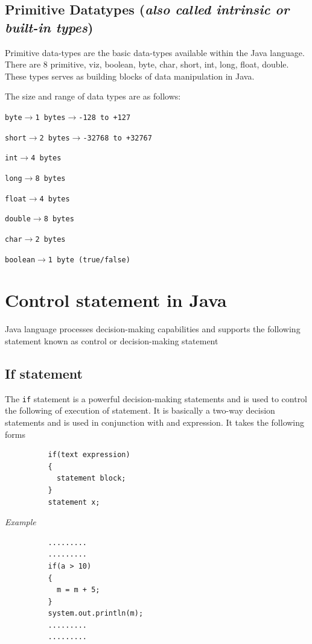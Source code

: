 \documentclass[11pt, a4paper]{book}
\begin{document}
    \subsection{Primitive Datatypes (\textit{also called intrinsic or built-in types})}
      Primitive data-types are the basic data-types available within the Java language. There are 8 primitive, viz, boolean, byte, char, short, int, long, float, double. These types serves as building blocks of data manipulation in Java.
  
      The size and range of data types are as follows:
  
      \texttt{byte}$\rightarrow$\texttt{1 bytes}$\rightarrow$\texttt{-128 to +127}
  
      \texttt{short}$\rightarrow$\texttt{2 bytes}$\rightarrow$\texttt{-32768 to +32767}
  
      \texttt{int}$\rightarrow$\texttt{4 bytes}
  
      \texttt{long}$\rightarrow$\texttt{8 bytes}
  
      \texttt{float}$\rightarrow$\texttt{4 bytes}
  
      \texttt{double}$\rightarrow$\texttt{8 bytes}
  
      \texttt{char}$\rightarrow$\texttt{2 bytes}
  
      \texttt{boolean}$\rightarrow$\texttt{1 byte (true/false)}
  
    \section{Control statement in Java}
      Java language processes decision-making capabilities and supports the following statement known as control or decision-making statement
      \subsection{If statement}
  
        The \texttt{if} statement is a powerful decision-making statements and is used to control the following of execution of statement. It is basically a two-way decision statements and is used in conjunction with and expression. It takes the following forms
        \begin{lstlisting}
          if(text expression)
          {
            statement block;
          }
          statement x;
        \end{lstlisting}
  
        \textit{Example}
        \begin{lstlisting}
          .........
          .........
          if(a > 10)
          {
            m = m + 5;
          }
          system.out.println(m);
          .........
          .........
        \end{lstlisting}
  
\end{document}
